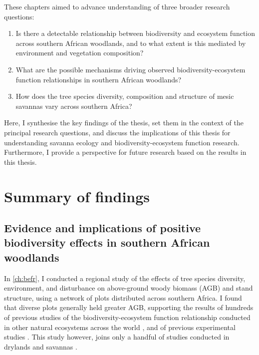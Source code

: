 \begin{refsection}
These chapters aimed to advance understanding of three broader research questions:

\begin{enumerate}
\item{Is there a detectable relationship between biodiversity and ecosystem function across southern African woodlands, and to what extent is this mediated by environment and vegetation composition?}
\item{What are the possible mechanisms driving observed biodiversity-ecosystem function relationships in southern African woodlands?}
\item{How does the tree species diversity, composition and structure of mesic savannas vary across southern Africa?}
\end{enumerate}

Here, I synthesise the key findings of the thesis, set them in the context of the principal research questions, and discuss the implications of this thesis for understanding savanna ecology and biodiversity-ecosystem function research. Furthermore, I provide a perspective for future research based on the results in this thesis.

\section{Summary of findings}
\label{discussion:sec:summ}

\subsection{Evidence and implications of positive biodiversity effects in southern African woodlands}
\label{discussion:ssec:ecology}

In \autoref{ch:befr}, I conducted a regional study of the effects of tree species diversity, environment, and disturbance on above-ground woody biomass (AGB) and stand structure, using a network of plots distributed across southern Africa. I found that diverse plots generally held greater AGB, supporting the results of hundreds of previous studies of the biodiversity-ecosystem function relationship conducted in other natural ecosystems across the world \citep{Plas2019}, and of previous experimental studies \citep{Tilman2014}. This study however, joins only a handful of studies conducted in drylands and savannas \citep{Maestre2012, Grace2016, Plas2019, Clarke2017}. 


\end{refsection}
